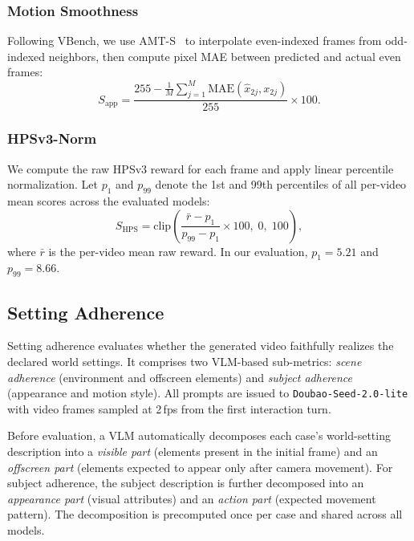\subsubsection{Motion Smoothness}
\label{app:smoothness_detail}

Following VBench, we use AMT-S~\cite{li2023amt} to interpolate even-indexed frames from odd-indexed neighbors, then compute pixel MAE between predicted and actual even frames:
\begin{equation}
  S_{\mathrm{app}} = \frac{255 - \frac{1}{M}\sum_{j=1}^{M}\text{MAE}(\hat{x}_{2j}, x_{2j})}{255} \times 100.
\end{equation}

\subsubsection{HPSv3-Norm}
\label{app:hps_detail}

We compute the raw HPSv3 reward for each frame and apply linear percentile normalization. Let $p_1$ and $p_{99}$ denote the 1st and 99th percentiles of all per-video mean scores across the evaluated models:
\begin{equation}
  S_{\text{HPS}} = \text{clip}\!\left(\frac{\bar{r} - p_1}{p_{99} - p_1} \times 100,\; 0,\; 100\right),
\end{equation}
where $\bar{r}$ is the per-video mean raw reward. In our evaluation, $p_1 = 5.21$ and $p_{99} = 8.66$.

\subsection{Setting Adherence}
\label{app:setting_detail}

Setting adherence evaluates whether the generated video faithfully realizes the declared world settings.
It comprises two VLM-based sub-metrics: \emph{scene adherence} (environment and offscreen elements) and \emph{subject adherence} (appearance and motion style).
All prompts are issued to \texttt{Doubao-Seed-2.0-lite} with video frames sampled at 2\,fps from the first interaction turn.

Before evaluation, a VLM automatically decomposes each case's world-setting description into a \emph{visible part} (elements present in the initial frame) and an \emph{offscreen part} (elements expected to appear only after camera movement).
For subject adherence, the subject description is further decomposed into an \emph{appearance part} (visual attributes) and an \emph{action part} (expected movement pattern).
The decomposition is precomputed once per case and shared across all models.

